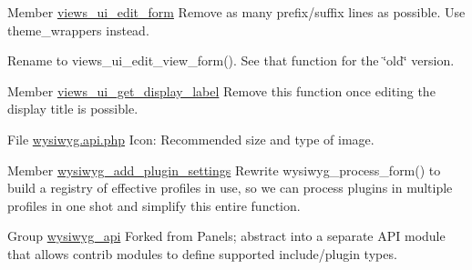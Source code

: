 \begin{DoxyDescription}
\item[Member \hyperlink{admin_8inc_a3c7bbae87e55e6a531c04c8135bd1231}{views\_\-ui\_\-edit\_\-form} ]Remove as many prefix/suffix lines as possible. Use theme\_\-wrappers instead.



Rename to views\_\-ui\_\-edit\_\-view\_\-form(). See that function for the \char`\"{}old\char`\"{} version.


\end{DoxyDescription}

\label{todo__todo000051}
\hypertarget{todo__todo000051}{}
 
\begin{DoxyDescription}
\item[Member \hyperlink{admin_8inc_a20b56808cc1c748e9a5d95b0753367b2}{views\_\-ui\_\-get\_\-display\_\-label} ]Remove this function once editing the display title is possible. 
\end{DoxyDescription}

\label{todo__todo000063}
\hypertarget{todo__todo000063}{}
 
\begin{DoxyDescription}
\item[File \hyperlink{wysiwyg_8api_8php}{wysiwyg.api.php} ]Icon: Recommended size and type of image.


\end{DoxyDescription}

\label{todo__todo000065}
\hypertarget{todo__todo000065}{}
 
\begin{DoxyDescription}
\item[Member \hyperlink{wysiwyg_8module_ab2d3844da95500eafb246c12e44593c3}{wysiwyg\_\-add\_\-plugin\_\-settings} ]Rewrite wysiwyg\_\-process\_\-form() to build a registry of effective profiles in use, so we can process plugins in multiple profiles in one shot and simplify this entire function. 
\end{DoxyDescription}

\label{todo__todo000066}
\hypertarget{todo__todo000066}{}
 
\begin{DoxyDescription}
\item[Group \hyperlink{group__wysiwyg__api}{wysiwyg\_\-api} ]Forked from Panels; abstract into a separate API module that allows contrib modules to define supported include/plugin types. 
\end{DoxyDescription}

